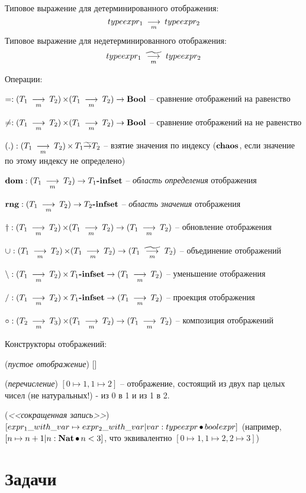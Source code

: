 \documentclass[14pt, twoside]{extreport}
\begin{document}
Типовое выражение для детерминированного отображения: $$typeexpr_1 \Map typeexpr_2$$ Типовое выражение для недетерминированного отображения: $$typeexpr_1 \NonDeterMap typeexpr_2$$

Операции:
\begin{list}{}{}
\item $=: (T_1 \Map T_2) \DP (T_1 \Map T_2) \Fn \Bool$ -- сравнение отображений на равенство
\item $\neq: (T_1 \Map T_2) \DP (T_1 \Map T_2) \Fn \Bool$ -- сравнение отображений на не равенство
\item $(.): (T_1 \Map T_2) \DP T_1 \NonDetermFn T_2$ -- взятие значения по индексу ($\Chaos$, если значение по этому индексу не
определено)
\item $\Dom: (T_1 \Map T_2) \Fn T_1\Infset$ -- \emph{область определения} отображения
\item $\Rng: (T_1 \Map T_2) \Fn T_2\Infset$ -- \emph{область значения} отображения
\item $\Upd: (T_1 \Map T_2) \DP (T_1 \Map T_2) \Fn (T_1 \Map T_2)$ -- обновление отображения
\item $\Union: (T_1 \Map T_2) \DP (T_1 \Map T_2) \Fn (T_1 \NonDeterMap T_2)$ -- объединение отображений
\item $\Minus: (T_1 \Map T_2) \DP T_1\Infset \Fn (T_1 \Map T_2)$ -- уменьшение отображения
\item $/: (T_1 \Map T_2) \DP T_1\Infset \Fn (T_1 \Map T_2)$ -- проекция отображения
\item $\Superp: (T_2 \Map T_3) \DP (T_1 \Map T_2) \Fn (T_1 \Map T_2)$ -- композиция отображений
\end{list}

Конструкторы отображений:
\begin{list}{}{}
\item (\emph{пустое отображение}) []
\item (\emph{перечисление}) $[0 \mapsto 1, 1 \mapsto 2]$ -- отображение, состоящий из двух пар целых чисел (не натуральных!) - из 0 в 1 и из 1 в 2.
\item (\emph{<<сокращенная запись>>}) $[expr_1\_with\_var \mapsto expr_2\_with\_var | var : typeexpr \SuchAs boolexpr]$ (например, $[n \mapsto n+1 | n : \Nat \SuchAs n < 3]$, что эквивалентно $[0 \mapsto 1, 1 \mapsto 2, 2 \mapsto 3]$)
\end{list}


\section*{Задачи}
\end{document}
